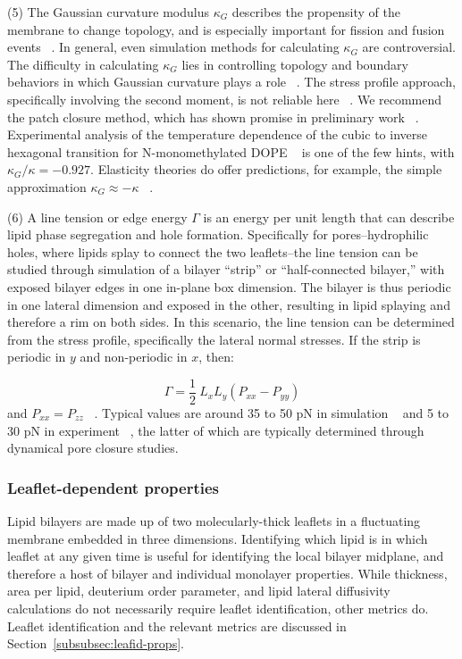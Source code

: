 \documentclass[9pt,bestpractices,pubversion]{livecoms}
\begin{document}
(5) The Gaussian curvature modulus $\kappa_G$ describes the propensity of the membrane to change topology, and is especially important for fission and fusion events ~\cite{Hu2012a}.
In general, even simulation methods for calculating $\kappa_G$ are controversial.
The difficulty in calculating $\kappa_G$ lies in controlling topology and boundary behaviors in which Gaussian curvature plays a role ~\cite{Hu2012a}.
The stress profile approach, specifically involving the second moment, is not reliable here  ~\cite{Hu2012a,Hu2013}.
We recommend the patch closure method, which has shown promise in preliminary work ~\cite{Hu2012a}.
Experimental analysis of the temperature dependence of the cubic to inverse hexagonal transition for N-monomethylated DOPE ~\cite{Siegel2008} is one of the few hints, with $\kappa_G / \kappa = -0.927$. %
Elasticity theories do offer predictions, for example, the simple approximation $\kappa_G \approx -\kappa$  ~\cite{Deserno2009,Hu2012a,Ramakrishnan2014c}.

(6) A line tension or edge energy $\Gamma$ is an energy per unit length that can describe lipid phase segregation and hole formation.
Specifically for pores--hydrophilic holes, where lipids splay to connect the two leaflets--the line tension can be studied through simulation of a bilayer ``strip'' or ``half-connected bilayer,'' with exposed bilayer edges in one in-plane box dimension.
The bilayer is thus periodic in one lateral dimension and exposed in the other, resulting in lipid splaying and therefore a rim on both sides.
In this scenario, the line tension can be determined from the stress profile, specifically the lateral normal stresses.
If the strip is periodic in $y$ and non-periodic in $x$, then:

\begin{equation}\label{eq:13}
	\Gamma = \frac{1}{2}\ L_x L_y (P_{xx} - P_{yy})
\end{equation}
and $P_{xx} = P_{zz}$ ~\cite{Tolpekina2004b}.
Typical values are around 35 to 50 pN in simulation ~\cite{Tolpekina2004b,Wohlert2006} and 5 to 30 pN in experiment ~\cite{Brochard-Wyarta2000,Moroz1996,Zhelev1993}, the latter of which are typically determined through dynamical pore closure studies.

\subsubsection{Leaflet-dependent properties}
\label{subsubsec:leafprops}
Lipid bilayers are made up of two molecularly-thick leaflets in a fluctuating membrane embedded in three dimensions.
Identifying which lipid is in which leaflet at any given time is useful for identifying the local bilayer midplane, and therefore a host of bilayer and individual monolayer properties.
While thickness, area per lipid, deuterium order parameter, and lipid lateral diffusivity calculations do not necessarily require leaflet identification, other metrics do. Leaflet identification and the relevant metrics are discussed in Section~\ref{subsubsec:leafid-props}.
\end{document}
